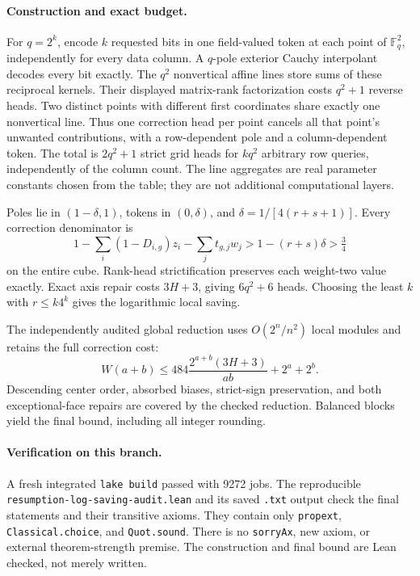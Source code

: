 \documentclass[11pt]{article}
\begin{document}
\paragraph{Construction and exact budget.}
For $q=2^k$, encode $k$ requested bits in one field-valued token at each
point of $\mathbb F_q^2$, independently for every data column.
A $q$-pole exterior Cauchy interpolant decodes every bit exactly.
The $q^2$ nonvertical affine lines store sums of these reciprocal kernels.
Their displayed matrix-rank factorization costs $q^2+1$ reverse heads.
Two distinct points with different first coordinates share exactly one
nonvertical line. Thus one correction head per point cancels all that
point's unwanted contributions, with a row-dependent pole and a
column-dependent token. The total is $2q^2+1$ strict grid heads for
$kq^2$ arbitrary row queries, independently of the column count.
The line aggregates are real parameter constants chosen from the table;
they are not additional computational layers.

Poles lie in $(1-\delta,1)$, tokens in $(0,\delta)$, and
$\delta=1/[4(r+s+1)]$. Every correction denominator is
\[
 1-\sum_i(1-D_{i,g})z_i-\sum_jt_{g,j}w_j>
 1-(r+s)\delta>\tfrac34
\]
on the entire cube. Rank-head strictification preserves each weight-two
value exactly. Exact axis repair costs $3H+3$, giving $6q^2+6$ heads.
Choosing the least $k$ with $r\leq k4^k$ gives the logarithmic local saving.

The independently audited global reduction uses
$O(2^n/n^2)$ local modules and retains the full correction cost:
\[
 W(a+b)\leq484\frac{2^{a+b}(3H+3)}{ab}+2^a+2^b.
\]
Descending center order, absorbed biases, strict-sign preservation, and
both exceptional-face repairs are covered by the checked reduction.
Balanced blocks yield the final bound, including all integer rounding.

\paragraph{Verification on this branch.}
A fresh integrated \texttt{lake build} passed with 9272 jobs. The reproducible
\texttt{resumption-log-saving-audit.lean} and its saved \texttt{.txt} output
check the final statements and their transitive axioms. They contain only
\texttt{propext}, \texttt{Classical.choice}, and \texttt{Quot.sound}.
There is no \texttt{sorryAx}, new axiom, or external theorem-strength premise.
The construction and final bound are Lean checked, not merely written.
\end{document}
